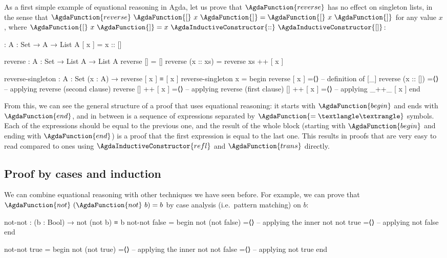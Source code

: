 \documentclass[a4paper,UKenglish]{tufte-handout}
\theoremstyle{definition}
\newcommand\fun[1]{{\AgdaFunction{#1}}}
\newcommand\con[1]{{\AgdaInductiveConstructor{#1}}}
\newcommand\nil{\con{[]}}
\newcommand\cons{\con{::}}
\newcommand\refl{\con{refl}}
\begin{document}
As a first simple example of equational reasoning in Agda, let us
prove that $\fun{reverse}$ has no effect on singleton lists, in the
sense that $\fun{reverse}\ \fun{[}\ x\ \fun{]} = \fun{[}\ x\
\fun{]}$ for any value $x$, where $\fun{[}\ x\ \fun{]} = x\ \cons\
\nil$:
\begin{AgdaAlign}
\begin{AgdaSuppressSpace}
\begin{code}[number]
[_] : {A : Set} → A → List A
[ x ] = x :: []

reverse : {A : Set} → List A → List A
reverse []         = []
reverse (x :: xs)  = reverse xs ++ [ x ]
\end{code}
\begin{code}[number]
reverse-singleton : {A : Set} (x : A) → reverse [ x ] ≡ [ x ]
reverse-singleton x =
  begin
    reverse [ x ]
  =⟨⟩                       --  definition of [_]
    reverse (x :: [])
  =⟨⟩                       --  applying reverse (second clause)
    reverse [] ++ [ x ]
  =⟨⟩                       --  applying reverse (first clause)
    [] ++ [ x ]
  =⟨⟩                       --  applying _++_
    [ x ]
  end
\end{code}
\end{AgdaSuppressSpace}
\end{AgdaAlign}
From this, we can see the general structure of a proof that uses
equational reasoning: it starts with $\fun{begin}$ and ends with
$\fun{end}$, and in between is a sequence of expressions separated by
$\fun{=⟨⟩}$ symbols. Each of the expressions should be equal to the
previous one, and the result of the whole block (starting with
$\fun{begin}$ and ending with $\fun{end}$) is a proof that the first
expression is equal to the last one. This results in proofs that are
very easy to read compared to ones using $\refl$ and $\fun{trans}$
directly.

\subsection{Proof by cases and induction}

We can combine equational reasoning with other techniques we have seen
before. For example, we can prove that $\fun{not}\ (\fun{not}\ b) = b$
by case analysis (i.e.~pattern matching) on $b$:
\begin{code}[number]
not-not : (b : Bool) → not (not b) ≡ b
not-not false =
  begin
    not (not false)
  =⟨⟩                -- applying the inner not
    not true
  =⟨⟩                -- applying not
    false
  end
\end{code}
\begin{code}[number]
not-not true =
  begin
    not (not true)
  =⟨⟩                -- applying the inner not
    not false
  =⟨⟩                -- applying not
    true
  end
\end{code}
\end{document}
